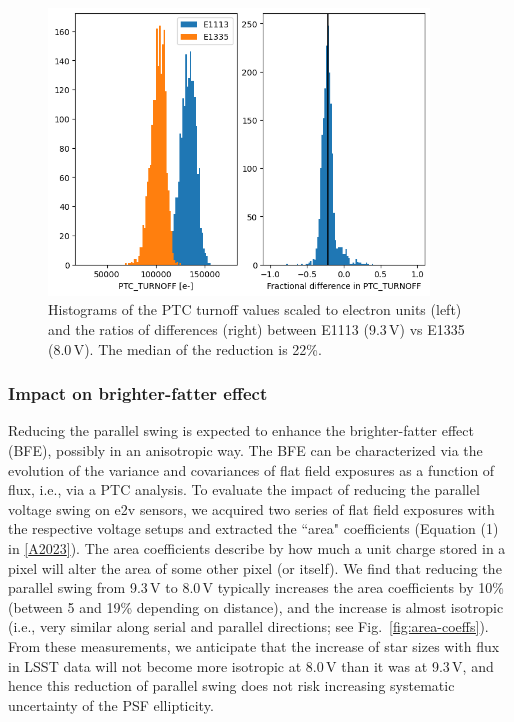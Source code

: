 \begin{figure}
\begin{centering}
\includegraphics[width=0.9\textwidth]{figures/PtcTurnoffRatio.png}
\end{centering}
\caption{Histograms of the PTC turnoff values scaled to electron units (left) and the ratios of
differences (right) between E1113 (9.3\,V) vs E1335 (8.0\,V). The median of
the reduction is 22\%.}
\label{fig:ptc-turnoff}
\end{figure}



\subsubsection{Impact on brighter-fatter
effect}\label{impact-on-brighter-fatter-effect}

Reducing the parallel swing is expected to enhance the brighter-fatter
effect (BFE), possibly in an anisotropic way. The BFE can be
characterized via the evolution of the variance and covariances of
flat field exposures as a function of flux, i.e., via a PTC analysis. To evaluate the
impact of reducing the parallel voltage swing on e2v sensors, we
acquired two series of flat field exposures with the respective voltage
setups and extracted the ``area" coefficients 
(Equation (1) in \hyperref[A2023]{{[}A2023{]}}). The area coefficients describe by how much a unit charge stored in
a pixel will alter the area of some other pixel (or itself). We find that
reducing the parallel swing from 9.3\,V to 8.0\,V typically increases the
area coefficients by 10\% (between 5 and 19\% depending on distance),
and the increase is almost isotropic (i.e., very similar along serial and parallel
directions; see Fig.~\ref{fig:area-coeffs}). From these measurements, we anticipate that the increase of
star sizes with flux in LSST data will not become more isotropic at 8.0\,V than it was at
9.3\,V, and hence this reduction of parallel swing does not 
risk increasing systematic uncertainty of the PSF ellipticity.


